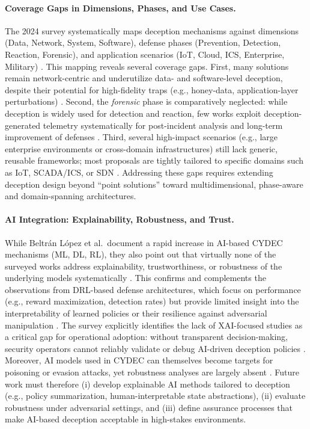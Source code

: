 \paragraph{Coverage Gaps in Dimensions, Phases, and Use Cases.}
The 2024 survey systematically maps deception mechanisms against dimensions (Data, Network, System, Software),
defense phases (Prevention, Detection, Reaction, Forensic), and application scenarios (IoT, Cloud, ICS, Enterprise, Military)
\cite{deceptiontrends2024}. This mapping reveals several coverage gaps. First, many solutions remain network-centric and
underutilize data- and software-level deception, despite their potential for high-fidelity traps (e.g., honey-data,
application-layer perturbations) \cite{deceptiontrends2024}. Second, the \emph{forensic} phase is comparatively neglected:
while deception is widely used for detection and reaction, few works exploit deception-generated telemetry systematically
for post-incident analysis and long-term improvement of defenses \cite{deceptiontrends2024,nawrocki2016survey}.
Third, several high-impact scenarios (e.g., large enterprise environments or cross-domain infrastructures) still lack
generic, reusable frameworks; most proposals are tightly tailored to specific domains such as IoT, SCADA/ICS,
or SDN \cite{deceptiontrends2024,dolos2023,aiipot2023}. Addressing these gaps requires extending deception design
beyond “point solutions” toward multidimensional, phase-aware and domain-spanning architectures.

\paragraph{AI Integration: Explainability, Robustness, and Trust.}
While Beltrán López et al.\ document a rapid increase in AI-based CYDEC mechanisms (ML, DL, RL), they also point out that
virtually none of the surveyed works address explainability, trustworthiness, or robustness of the underlying models systematically \cite{deceptiontrends2024}.
This confirms and complements the observations from DRL-based defense architectures,
which focus on performance (e.g., reward maximization, detection rates) but provide limited insight into the interpretability
of learned policies or their resilience against adversarial manipulation \cite{hammad2024deep}. The survey explicitly
identifies the lack of XAI-focused studies as a critical gap for operational adoption: without transparent decision-making,
security operators cannot reliably validate or debug AI-driven deception policies \cite{deceptiontrends2024}. Moreover,
AI models used in CYDEC can themselves become targets for poisoning or evasion attacks, yet robustness analyses are
largely absent \cite{deceptiontrends2024}. Future work must therefore (i) develop explainable AI methods tailored
to deception (e.g., policy summarization, human-interpretable state abstractions), (ii) evaluate robustness under
adversarial settings, and (iii) define assurance processes that make AI-based deception acceptable in high-stakes environments.

